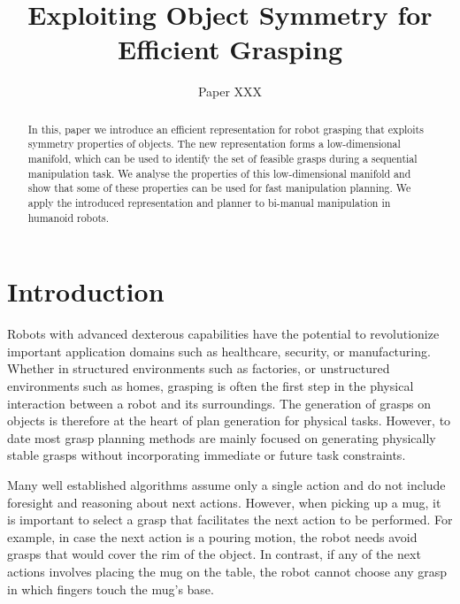 \documentclass{aamas2015}
\begin{document}
\title{Exploiting Object Symmetry for Efficient Grasping}

\author{
\alignauthor
Paper XXX
}

\newcommand{\vech}[1]{\textbf{#1}}
\newcommand{\set}[1]{\textbf{#1}}

\maketitle


\begin{abstract}
In this, paper we introduce an efficient representation for robot grasping that exploits symmetry
properties of objects. The new representation forms a low-dimensional manifold, which can be used to
identify the set of feasible grasps during a sequential manipulation task. We analyse the properties
of this low-dimensional manifold and show that some of these properties can be used for fast
manipulation planning. We apply the introduced representation and planner to bi-manual manipulation
in humanoid robots.
\end{abstract}

\section{Introduction}

Robots with advanced dexterous capabilities have the potential to revolutionize important
application domains such as healthcare, security, or manufacturing. Whether in structured
environments such as factories, or unstructured environments such as homes, grasping is often the
first step in the physical interaction between a robot and its surroundings. The generation of
grasps on objects is therefore at the heart of plan generation for physical tasks. However, to date most grasp
planning methods are mainly focused on generating physically stable grasps without incorporating
immediate or future task constraints. 

Many well established algorithms assume only a single action and do not include foresight and
reasoning about next actions. However, when picking up a mug, it is important to select a grasp that
facilitates the next action to be performed. For example, in case the next action is a pouring motion, the robot
needs avoid grasps that would cover the rim of the object. In contrast, if any of the next actions
involves placing the mug on the table, the robot cannot choose any grasp in which fingers touch the
mug's base. 
\end{document}
